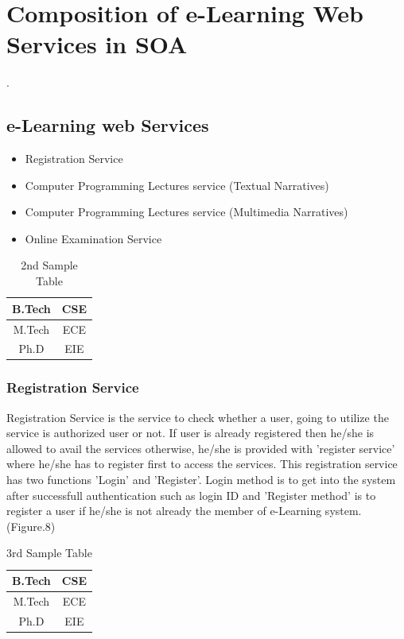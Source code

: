\blindtext\chapter{Composition of e-Learning Web Services in SOA}
\blindtext  \cite{com, com2}.
\section{e-Learning web Services}
\blindtext
\begin{itemize}
 \item Registration Service
\item Computer Programming Lectures service (Textual Narratives)
\item  Computer Programming Lectures service (Multimedia Narratives)
\item Online Examination Service
\end{itemize}

\begin{table}
 \begin{center}
 \caption{2nd Sample Table}
 \begin{tabular}{|c|c|}
 \hline
 B.Tech & CSE\\
 \hline
 M.Tech & ECE\\
 \hline
 Ph.D & EIE\\
 \hline 
 \end{tabular}
 \end{center}
\end{table}

\subsection{Registration Service}
Registration Service is the service to check whether a user, going to utilize the service is authorized user or not. If user is already registered
then he/she is allowed to avail the services otherwise, he/she is provided with 'register service' where he/she has to register first to access the services. This registration service 
has two functions 'Login' and 'Register'. Login method is to get into the system after successfull authentication such as login ID 
and 'Register method' is to register a user if he/she is not already the member of e-Learning system. (Figure.8)   

\begin{table}
 \begin{center}
 \caption{3rd Sample Table}
 \begin{tabular}{|c|c|}
 \hline
 B.Tech & CSE\\
 \hline
 M.Tech & ECE\\
 \hline
 Ph.D & EIE\\
 \hline 
 \end{tabular}
 \end{center}
\end{table}

